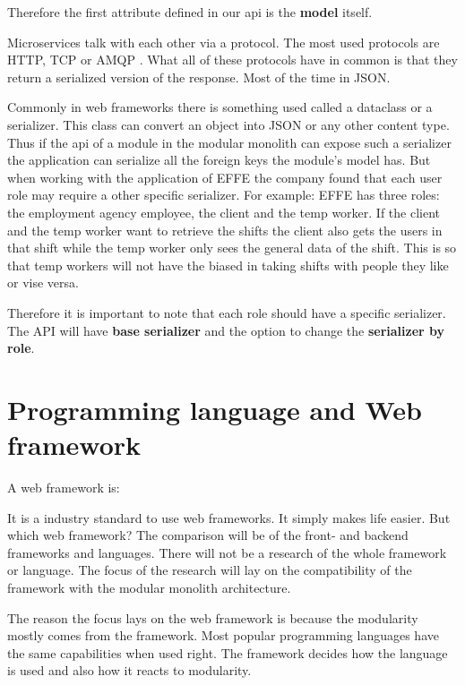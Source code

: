 Therefore the first attribute defined in our api is the \textbf{model} itself.

Microservices talk with each other via a protocol. The most used protocols are HTTP, TCP or AMQP \cite{microservicesAPI}. What all of these protocols have in common is that they return a serialized version of the response. Most of the time in JSON.

Commonly in web frameworks there is something used called a dataclass or a serializer. This class can convert an object into JSON or any other content type. Thus if the api of a module in the modular monolith can expose such a serializer the application can serialize all the foreign keys the module's model has. But when working with the application of EFFE the company found that each user role may require a other specific serializer. For example: EFFE has three roles: the employment agency employee, the client and the temp worker. If the client and the temp worker want to retrieve the shifts the client also gets the users in that shift while the temp worker only sees the general data of the shift. This is so that temp workers will not have the biased in taking shifts with people they like or vise versa.

Therefore it is important to note that each role should have a specific serializer. The API will have \textbf{base serializer} and the option to change the \textbf{serializer by role}.

\section{Programming language and Web framework}

A web framework is:


It is a industry standard to use web frameworks. It simply makes life easier. But which web framework? The comparison will be of the front- and backend frameworks and languages. There will not be a research of the whole framework or language. The focus of the research will lay on the compatibility of the framework with the modular monolith architecture.

The reason the focus lays on the web framework is because the modularity mostly comes from the framework. Most popular programming languages have the same capabilities when used right. The framework decides how the language is used and also how it reacts to modularity.

